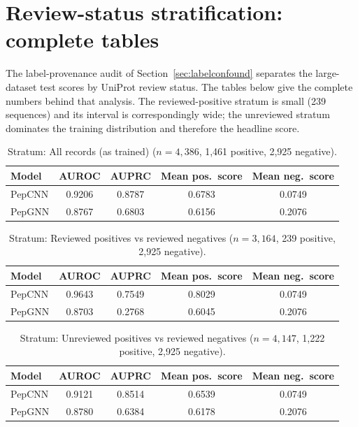 
\section{Review-status stratification: complete tables}\label{app:strata}
The label-provenance audit of Section~\ref{sec:labelconfound} separates the
large-dataset test scores by UniProt review status. The tables below give
the complete numbers behind that analysis. The reviewed-positive stratum
is small (239 sequences) and its interval is correspondingly wide; the
unreviewed stratum dominates the training distribution and therefore the
headline score.

\begin{table}[h]\centering\small
\caption{Stratum: All records (as trained) ($n=4,386$, 1,461 positive, 2,925 negative).}
\label{tab:strata-all}
\begin{tabular}{lcccc}
\hline
Model & AUROC & AUPRC & Mean pos.\ score & Mean neg.\ score \\
\hline
PepCNN & 0.9206 & 0.8787 & 0.6783 & 0.0749 \\
PepGNN & 0.8767 & 0.6803 & 0.6156 & 0.2076 \\
\hline
\end{tabular}
\end{table}


\begin{table}[h]\centering\small
\caption{Stratum: Reviewed positives vs reviewed negatives ($n=3,164$, 239 positive, 2,925 negative).}
\label{tab:strata-reviewed-only}
\begin{tabular}{lcccc}
\hline
Model & AUROC & AUPRC & Mean pos.\ score & Mean neg.\ score \\
\hline
PepCNN & 0.9643 & 0.7549 & 0.8029 & 0.0749 \\
PepGNN & 0.8703 & 0.2768 & 0.6045 & 0.2076 \\
\hline
\end{tabular}
\end{table}


\begin{table}[h]\centering\small
\caption{Stratum: Unreviewed positives vs reviewed negatives ($n=4,147$, 1,222 positive, 2,925 negative).}
\label{tab:strata-unreviewed-positive-vs-reviewed-negative}
\begin{tabular}{lcccc}
\hline
Model & AUROC & AUPRC & Mean pos.\ score & Mean neg.\ score \\
\hline
PepCNN & 0.9121 & 0.8514 & 0.6539 & 0.0749 \\
PepGNN & 0.8780 & 0.6384 & 0.6178 & 0.2076 \\
\hline
\end{tabular}
\end{table}
